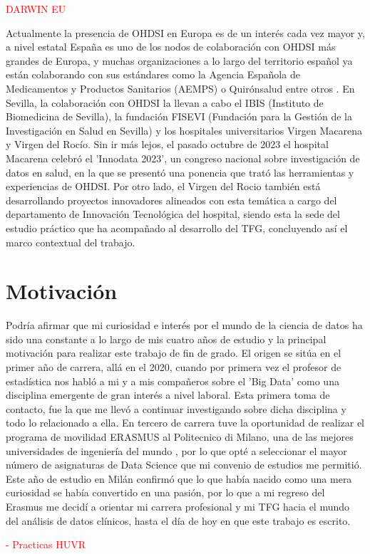 \textcolor{red}{DARWIN EU}

Actualmente la presencia de OHDSI en Europa es de un interés cada vez mayor y, a nivel estatal España es uno de los nodos de colaboración con OHDSI más grandes de Europa, y muchas organizaciones a lo largo del territorio español ya están colaborando con sus estándares como la Agencia Española de Medicamentos y Productos Sanitarios (AEMPS) o Quirónsalud entre otros \cite{ohdsiSpain}. En Sevilla, la colaboración con OHDSI la llevan a cabo el IBIS (Instituto de Biomedicina de Sevilla), la fundación FISEVI (Fundación para la Gestión de la Investigación en Salud en Sevilla) y los hospitales universitarios Virgen Macarena y Virgen del Rocío. Sin ir más lejos, el pasado octubre de 2023 el hospital Macarena celebró el 'Innodata 2023', un congreso nacional sobre investigación de datos en salud, en la que se presentó una ponencia que trató las herramientas y experiencias de OHDSI. Por otro lado, el Virgen del Rocio también está desarrollando proyectos innovadores alineados con esta temática a cargo del departamento de Innovación Tecnológica del hospital, siendo esta la sede del estudio práctico que ha acompañado al desarrollo del TFG, concluyendo así el marco contextual del trabajo.



\section{Motivación}



Podría afirmar que mi curiosidad e interés por el mundo de la ciencia de datos ha sido una constante a lo largo de mis cuatro años de estudio y la principal motivación para realizar este trabajo de fin de grado. El origen se sitúa en el primer año de carrera, allá en el 2020, cuando por primera vez el profesor de estadística nos habló a mi y a mis compañeros sobre el 'Big Data' como una disciplina emergente de gran interés a nivel laboral. Esta primera toma de contacto, fue la que me llevó a continuar investigando sobre dicha disciplina y todo lo relacionado a ella. En tercero de carrera tuve la oportunidad de realizar el programa de movilidad ERASMUS al Politecnico di Milano, una de las mejores universidades de ingeniería del mundo \cite{QSPolimi}, por lo que opté a seleccionar el mayor número de asignaturas de Data Science que mi convenio de estudios me permitió. Este año de estudio en Milán confirmó que lo que había nacido como una mera curiosidad se había convertido en una pasión, por lo que a mi regreso del Erasmus me decidí a orientar mi carrera profesional y mi TFG hacia el mundo del análisis de datos clínicos, hasta el día de hoy en que este trabajo es escrito.


\textcolor{red}{- Practicas HUVR}
